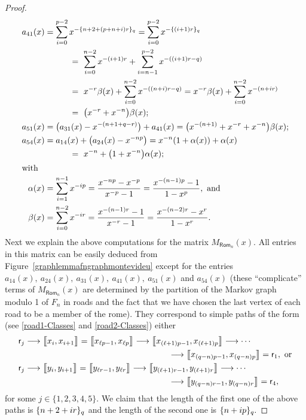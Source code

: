 \documentclass[a4paper, 11pt]{amsart}
\numberwithin{equation}{section}
\theoremstyle{customnumberedtheorem}
\theoremstyle{definitionwithbfnote}
\newcommand{\bigBIclass}[1]{\ensuremath{\bigl\llbracket #1\bigr\rrbracket}}
\newcommand{\modulo}[2]{\{#1\}\sb{#2}}
\begin{document}
\begin{proof}
\begin{align*}
   a_{41}(x) &= \sum_{i=0}^{p-2} x^{-\modulo{n+2+(p+n+i)r}{q}} = \sum_{i=0}^{p-2} x^{-\modulo{(i+1)r}{q}}\\
             &\hspace*{3em}=\ \sum_{i=0}^{n-2} x^{-(i+1)r} + \sum_{i=n-1}^{p-2} x^{-((i+1)r-q)}\\
             &\hspace*{3em}=\ x^{-r}\beta(x) + \sum_{i=0}^{n-2} x^{-((n+i)r-q)} = x^{-r}\beta(x) + \sum_{i=0}^{n-2} x^{-(n + ir)}\\
             &\hspace*{3em}=\ \bigl(x^{-r}+x^{-n}\bigr)\beta(x);\\
   a_{51}(x) &= \bigl(a_{31}(x) - x^{-(n+1+q-r)}\bigr) + a_{41}(x) = \bigl(x^{-(n+1)} + x^{-r}+x^{-n}\bigr)\beta(x);\\
   a_{54}(x) &= a_{14}(x) + \bigl(a_{24}(x) - x^{-np}\bigr) = x^{-n}(1+\alpha(x)) + \alpha(x)\\
             &\hspace*{3em}=\ x^{-n} + \bigl(1 + x^{-n}\bigr)\alpha(x);\\
\intertext{with}
   \alpha(x) &= \sum_{i=1}^{n-1} x^{-ip} = \frac{x^{-np}-x^{-p}}{x^{-p}-1} = \frac{x^{-(n-1)p}-1}{1-x^{p}},\text{ and}\\
   \beta(x)  &= \sum_{i=0}^{n-2} x^{-ir} = \frac{x^{-(n-1)r}-1}{x^{-r}-1} = \frac{x^{-(n-2)r}-x^r}{1-x^{r}}.
\end{align*}
Next we explain the above computations for the matrix $M_{\textsf{Rom}_n}(x).$
All entries in this matrix can be easily deduced from
Figure~\ref{graphlemmafngraphmontevideu} except for the entries
$a_{14}(x), \ a_{24}(x),\ a_{31}(x),\ a_{41}(x),\ a_{51}(x)$ and $a_{54}(x)$
(these ``complicate'' terms of $M_{\textsf{Rom}_n}(x)$
are determined by the partition of the Markov graph modulo 1 of $F_n$
in roads and the fact that we have chosen the last vertex of each road
to be a member of the rome).
They correspond to simple paths of the form
(see \eqref{road1-Classes} and \eqref{road2-Classes})
either
\begin{align*}
 & \textsf{r}_j \longrightarrow
   \bigBIclass{x_i, x_{i+1}} =
   \bigBIclass{x_{\ell p-1},x_{\ell p}} \longrightarrow
   \bigBIclass{x_{(\ell+1)p - 1},x_{(\ell+1)p}} \longrightarrow\cdots\\
 & \hspace*{18em}\longrightarrow \bigBIclass{x_{(q-n)p-1},x_{(q-n)p}} = \textsf{r}_1,\text{ or}\\
 & \textsf{r}_j \longrightarrow
   \bigBIclass{y_i, y_{i+1}} =
   \bigBIclass{y_{\ell r-1},y_{\ell r}} \longrightarrow
   \bigBIclass{y_{(\ell+1)r - 1},y_{(\ell+1)r}} \longrightarrow\cdots\\
 & \hspace*{18em}\longrightarrow\bigBIclass{y_{(q-n)r-1},y_{(q-n)r}} = \textsf{r}_4,
\end{align*}
for some $j\in\{1,2,3,4,5\}.$
We claim that the length of the first one of the above paths is
$\modulo{n+2+ir}{q}$ and the length of the second one is
$\modulo{n+ip}{q}.$


\end{proof}
\end{document}
